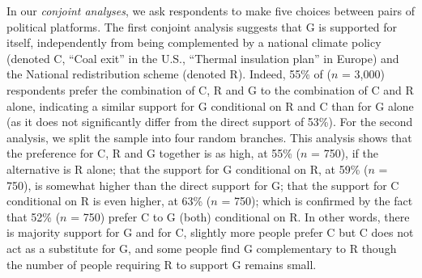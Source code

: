 \documentclass{nature}
\begin{document}
In our \textit{conjoint analyses}, we ask respondents to make five choices between pairs of political platforms. The first conjoint analysis suggests that G is supported for itself, independently from being complemented by a national climate policy (denoted C, ``Coal exit'' in the U.S., ``Thermal insulation plan'' in Europe) and the National redistribution scheme (denoted R). Indeed, 55\% of ($n$ = 3,000) respondents prefer the combination of C, R and G to the combination of C and R alone, indicating a similar support for G conditional on R and C than for G alone (as it does not significantly differ from the direct support of 53\%). For the second analysis, we split the sample into four random branches. This analysis shows that the preference for C, R and G together is as high, at 55\% ($n$ = 750), if the alternative is R alone; that the support for G conditional on R, at 59\% ($n$ = 750), is somewhat higher than the direct support for G; that the support for C conditional on R is even higher, at 63\% ($n$ = 750); which is confirmed by the fact that 52\% ($n$ = 750) prefer C to G (both) conditional on R. In other words, there is majority support for G and for C, slightly more people prefer C but C does not act as a substitute for G, and some people find G complementary to R though the number of people requiring R to support G remains small. 
\end{document}
